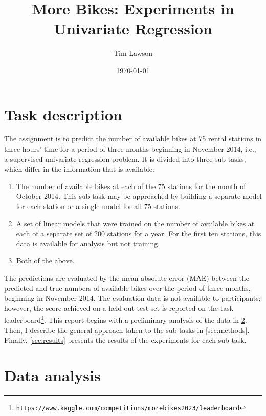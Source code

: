 \documentclass[11pt]{extarticle}
\begin{document}
\title{More Bikes: Experiments in Univariate Regression}
\author{Tim Lawson}
\date{\today}

\maketitle

\section{Task description}

The assignment is to predict the number of available bikes at 75 rental stations in
three hours' time for a period of three months beginning in November 2014, i.e., a
supervised univariate regression problem.
It is divided into three sub-tasks, which differ in the information that is available:
\begin{enumerate}
  \item The number of available bikes at each of the 75 stations for the month of October 2014.
        This sub-task may be approached by building a separate model for each station or a
        single model for all 75 stations.
  \item A set of linear models that were trained on the number of available bikes at each of a
        separate set of 200 stations for a year.
        For the first ten stations, this data is available for analysis but not training.
  \item Both of the above.
\end{enumerate}
The predictions are evaluated by the mean absolute error (MAE) between the predicted
and true numbers of available bikes over the period of three months, beginning in
November 2014.
The evaluation data is not available to participants; however, the score achieved on a
held-out test set is reported on the task
leaderboard\footnote{\href{https://www.kaggle.com/competitions/morebikes2023/leaderboard}{\texttt{https://www.kaggle.com/competitions/morebikes2023/leaderboard}}}.
This report begins with a preliminary analysis of the data in \cref{sec:data-analysis}.
Then, I describe the general approach taken to the sub-tasks in \cref{sec:methods}.
Finally, \cref{sec:results} presents the results of the experiments for each sub-task.

\section{Data analysis}
\label{sec:data-analysis}
\end{document}
